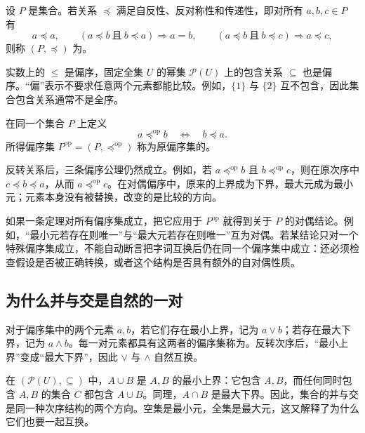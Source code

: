 \documentclass[UTF8]{ctexart}
\begin{document}
\begin{definition}[偏序]
设 $P$ 是集合。若关系 $\preceq$ 满足自反性、反对称性和传递性，即对所有 $a,b,c\in P$ 有
\[
 a\preceq a,\qquad
 (a\preceq b\ \text{且}\ b\preceq a)\Longrightarrow a=b,
 \qquad
 (a\preceq b\ \text{且}\ b\preceq c)\Longrightarrow a\preceq c,
\]
则称 $(P,\preceq)$ 为。
\end{definition}

实数上的 $\leq$ 是偏序，固定全集 $U$ 的幂集 $\mathcal P(U)$ 上的包含关系 $\subseteq$ 也是偏序。“偏”表示不要求任意两个元素都能比较。例如，$\{1\}$ 与 $\{2\}$ 互不包含，因此集合包含关系通常不是全序。

\begin{definition}[对偶偏序]
在同一个集合 $P$ 上定义
\[
 a\preceq^{\mathrm{op}} b\quad\Longleftrightarrow\quad b\preceq a.
\]
所得偏序集 $P^{\mathrm{op}}=(P,\preceq^{\mathrm{op}})$ 称为原偏序集的。
\end{definition}

反转关系后，三条偏序公理仍然成立。例如，若 $a\preceq^{\mathrm{op}}b$ 且 $b\preceq^{\mathrm{op}}c$，则在原次序中 $c\preceq b\preceq a$，从而 $a\preceq^{\mathrm{op}}c$。在对偶偏序中，原来的上界成为下界，最大元成为最小元；元素本身没有被替换，改变的是比较的方向。

\begin{remark}[定理的适用对象也要随之转换]
如果一条定理对所有偏序集成立，把它应用于 $P^{\mathrm{op}}$ 就得到关于 $P$ 的对偶结论。例如，“最小元若存在则唯一”与“最大元若存在则唯一”互为对偶。若某结论只对一个特殊偏序集成立，不能自动断言把字词互换后仍在同一个偏序集中成立：还必须检查假设是否被正确转换，或者这个结构是否具有额外的自对偶性质。
\end{remark}

\subsection{为什么并与交是自然的一对}

对于偏序集中的两个元素 $a,b$，若它们存在最小上界，记为 $a\vee b$；若存在最大下界，记为 $a\wedge b$。每一对元素都具有这两者的偏序集称为。反转次序后，“最小上界”变成“最大下界”，因此 $\vee$ 与 $\wedge$ 自然互换。

在 $(\mathcal P(U),\subseteq)$ 中，$A\cup B$ 是 $A,B$ 的最小上界：它包含 $A,B$，而任何同时包含 $A,B$ 的集合 $C$ 都包含 $A\cup B$。同理，$A\cap B$ 是最大下界。因此，集合的并与交是同一种次序结构的两个方向。空集是最小元，全集是最大元，这又解释了为什么它们也要一起互换。
\end{document}
